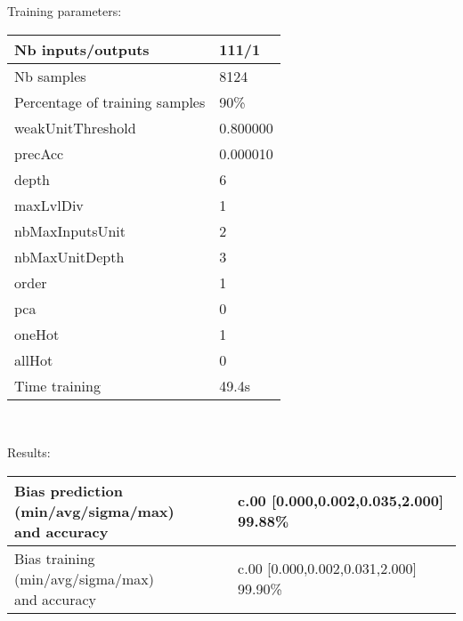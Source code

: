 Training parameters:\\
\begin{center}
\begin{tabular}{|l|l|}
\hline
Nb inputs/outputs&111/1\\
\hline
Nb samples&8124\\
\hline
Percentage of training samples&90\%\\
\hline
weakUnitThreshold&0.800000\\
\hline
precAcc&0.000010\\
\hline
depth&6\\
\hline
maxLvlDiv&1\\
\hline
nbMaxInputsUnit&2\\
\hline
nbMaxUnitDepth&3\\
\hline
order&1\\
\hline
pca&0\\
\hline
oneHot&1\\
\hline
allHot&0\\
\hline
Time training&49.4s\\
\hline
\end{tabular}\\
\end{center}\newline
Results:
\begin{center}
\begin{tabular}{|l|l|}
\hline
\makecell{Bias prediction (min/avg/sigma/max)\\and accuracy}&\makecell{c.00 [0.000,0.002,0.035,2.000] 99.88\%\\
}\\

\hline
\makecell{Bias training (min/avg/sigma/max)\\and accuracy}&\makecell{c.00 [0.000,0.002,0.031,2.000] 99.90\%\\
}\\
\hline
\end{tabular}\
\end{center}
